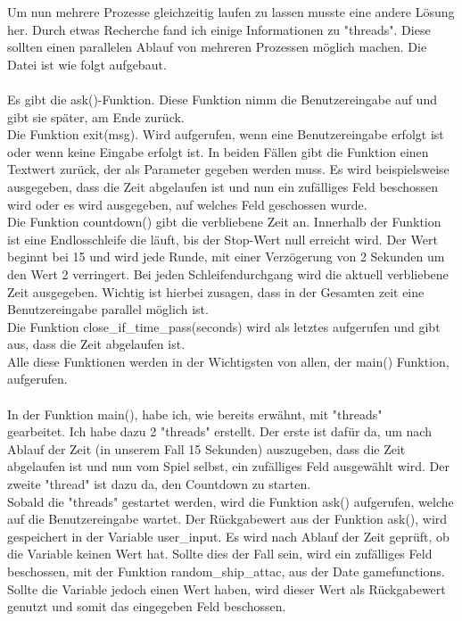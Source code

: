 \documentclass{article}
\begin{document}
    Um nun mehrere Prozesse gleichzeitig laufen zu lassen musste eine andere Lösung her. Durch etwas Recherche fand ich einige Informationen zu "threads". Diese sollten einen parallelen Ablauf von mehreren Prozessen möglich machen. Die Datei ist wie folgt aufgebaut.\\\\Es gibt die ask()-Funktion. Diese Funktion nimm die Benutzereingabe auf und gibt sie später, am Ende zurück.\\Die Funktion exit(msg). Wird aufgerufen, wenn eine Benutzereingabe erfolgt ist oder wenn keine Eingabe erfolgt ist. In beiden Fällen gibt die Funktion einen Textwert zurück, der als Parameter gegeben werden muss. Es wird beispielsweise ausgegeben, dass die Zeit abgelaufen ist und nun ein zufälliges Feld beschossen wird oder es wird ausgegeben, auf welches Feld geschossen wurde.\\Die Funktion countdown() gibt die verbliebene Zeit an. Innerhalb der Funktion ist eine Endlosschleife die läuft, bis der Stop-Wert null erreicht wird. Der Wert beginnt bei 15 und wird  jede Runde, mit einer  Verzögerung von 2 Sekunden um den Wert 2 verringert. Bei jeden Schleifendurchgang wird die aktuell verbliebene Zeit ausgegeben. Wichtig  ist hierbei zusagen, dass in der Gesamten zeit eine Benutzereingabe parallel möglich ist.\\Die Funktion close\_if\_time\_pass(seconds) wird als letztes aufgerufen und gibt aus, dass die Zeit abgelaufen ist.\\Alle diese Funktionen werden in der Wichtigsten von allen, der main() Funktion, aufgerufen.\\\\In der Funktion main(), habe ich, wie bereits erwähnt, mit "threads"\\gearbeitet. Ich habe dazu 2 "threads" erstellt. Der erste ist dafür da, um nach Ablauf der Zeit (in unserem Fall 15 Sekunden) auszugeben, dass die Zeit abgelaufen ist und nun vom Spiel selbst, ein zufälliges Feld ausgewählt wird. Der zweite "thread" ist dazu da, den Countdown zu starten.\\Sobald die "threads" gestartet werden, wird die Funktion ask() aufgerufen, welche auf die Benutzereingabe wartet. Der Rückgabewert aus der Funktion ask(), wird gespeichert in der Variable user\_input. Es wird nach Ablauf der Zeit geprüft, ob die Variable keinen Wert hat. Sollte dies der Fall sein, wird ein zufälliges Feld beschossen, mit der Funktion random\_ship\_attac, aus der Date gamefunctions. Sollte die Variable jedoch einen Wert haben, wird dieser Wert als Rückgabewert genutzt und somit das eingegeben Feld beschossen.
\end{document}
